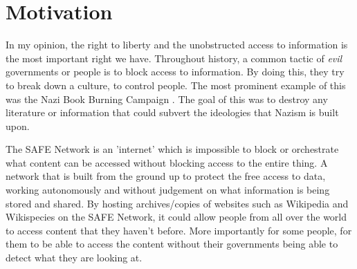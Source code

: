 \section{Motivation}

In my opinion, the right to liberty and the unobstructed access to information is the most important right we have. Throughout history, a common tactic of \textit{evil} governments or people is to block access to information. By doing this, they try to break down a culture, to control people. The most prominent example of this was the Nazi Book Burning Campaign \cite{book-burning}. The goal of this was to destroy any literature or information that could subvert the ideologies that Nazism is built upon.

The SAFE Network is an 'internet' which is impossible to block or orchestrate what content can be accessed without blocking access to the entire thing. A network that is built from the ground up to protect the free access to data, working autonomously and without judgement on what information is being stored and shared. By hosting archives/copies of websites such as Wikipedia and Wikispecies on the SAFE Network, it could allow people from all over the world to access content that they haven't before. More importantly for some people, for them to be able to access the content without their governments being able to detect what they are looking at.
